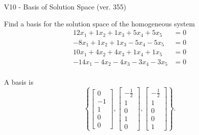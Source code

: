 \begin{exercise}
  \begin{exerciseTitle}V10 - Basis of Solution Space (ver. 355)\end{exerciseTitle}
  \begin{exerciseStatement}
    Find a basis for the solution space of the homogeneous system 
\begin{align*}
 12 x_ 1 + 1 x_ 2 + 1 x_ 3 + 5 x_ 4 + 5 x_ 5 &= 0  \\ 
  -8 x_ 1 + 1 x_ 2 + 1 x_ 3 -5 x_ 4 -5 x_ 5 &= 0  \\ 
  10 x_ 1 + 4 x_ 2 + 4 x_ 3 + 1 x_ 4 + 1 x_ 5 &= 0  \\ 
  -14 x_ 1 -4 x_ 2 -4 x_ 3 -3 x_ 4 -3 x_ 5 &= 0  \\ 
 \end{align*}


 
  \end{exerciseStatement}

  \begin{exerciseAnswer}
   A basis is   
\[\left\{\left[\begin{array}{c}
0 \\
-1 \\
1 \\
0 \\
0
\end{array}\right] , \left[\begin{array}{c}
-\frac{1}{2} \\
1 \\
0 \\
1 \\
0
\end{array}\right] , \left[\begin{array}{c}
-\frac{1}{2} \\
1 \\
0 \\
0 \\
1
\end{array}\right]\right\}.\]

  


  \end{exerciseAnswer}
\end{exercise}